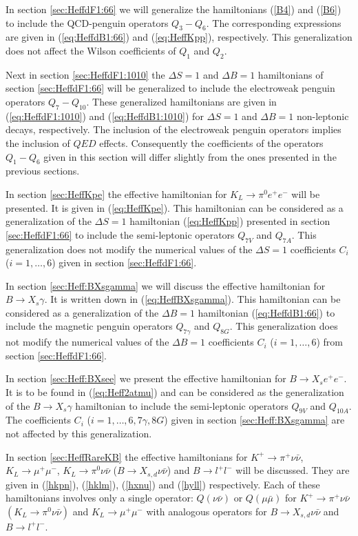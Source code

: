 In section \ref{sec:HeffdF1:66} we will generalize the hamiltonians
(\ref{B4}) and (\ref{B6}) to include the QCD-penguin operators
$Q_3-Q_6$.
The corresponding expressions are given in (\ref{eq:HeffdB1:66}) and
(\ref{eq:HeffKpp}), respectively.  This generalization does not affect
the Wilson coefficients of $Q_1$ and $Q_2$.

Next in section \ref{sec:HeffdF1:1010} the $\Delta S=1$ and $\Delta
B=1$ hamiltonians of section \ref{sec:HeffdF1:66} will be generalized
to include the electroweak penguin operators $Q_7-Q_{10}$. These
generalized hamiltonians are given in (\ref{eq:HeffdF1:1010}) and
(\ref{eq:HeffdB1:1010}) for $\Delta S=1$ and $\Delta B=1$ non-leptonic
decays, respectively.  The inclusion of the electroweak penguin
operators implies the inclusion of $QED$ effects. Consequently the
coefficients of the operators $Q_1-Q_6$ given in this section will
differ slightly from the ones presented in the previous sections.

In section \ref{sec:HeffKpe} the effective hamiltonian for $K_L\to
\pi^0 e^+e^- $ will be presented.  It is given in (\ref{eq:HeffKpe}).
This hamiltonian can be considered as a generalization of the $\Delta
S=1$ hamiltonian (\ref{eq:HeffKpp}) presented in section
\ref{sec:HeffdF1:66} to include the semi-leptonic operators $Q_{7V}$
and $Q_{7A}$. This generalization does not modify the numerical values
of the $\Delta S=1$ coefficients $C_i$ ($i=1,\ldots,6$) given in
section \ref{sec:HeffdF1:66}.

In section \ref{sec:Heff:BXsgamma} we will discuss the effective
hamiltonian for $B\to X_s\gamma$. It is written down in
(\ref{eq:HeffBXsgamma}). This hamiltonian can be considered as a
generalization of the $\Delta B=1$ hamiltonian (\ref{eq:HeffdB1:66})
to include the magnetic penguin operators $Q_{7\gamma}$ and $Q_{8G}$.
This generalization does not modify the numerical values of the $\Delta
B=1$ coefficients $C_i$ ($i=1,\ldots,6$) from section \ref{sec:HeffdF1:66}.

In section \ref{sec:Heff:BXsee} we present the effective hamiltonian
for $B\to X_s e^+ e^- $. It is to be found in (\ref{eq:Heff2atmu}) and
can be considered as the generalization of the $B\to X_s\gamma$
hamiltonian to include the semi-leptonic operators $Q_{9V}$ and
$Q_{10A}$.  The coefficients $C_i$ ($i=1,\ldots,6,7\gamma,8G$) given in
section \ref{sec:Heff:BXsgamma} are not affected by this
generalization.

In section \ref{sec:HeffRareKB} the effective hamiltonians for
$K^+\to\pi^+\nu\bar\nu$, $K_L\to\mu^+\mu^-$, $K_L\to \pi^0\nu\bar\nu$
($B\to X_{s,d}\nu\bar\nu$) and $B\to l^+l^-$ will be discussed.  They
are given in (\ref{hkpn}), (\ref{hklm}), (\ref{hxnu}) and (\ref{hyll})
respectively. Each of these hamiltonians involves only a single
operator:  $Q(\nu\bar\nu)$ or $Q(\mu\bar\mu)$ for
$K^+\to\pi^+\nu\bar\nu$ $(K_L\to \pi^0\nu\bar\nu)$ and
$K_L\to\mu^+\mu^-$ with analogous operators for $B\to
X_{s,d}\nu\bar\nu$ and $B\to l^+l^-$.

